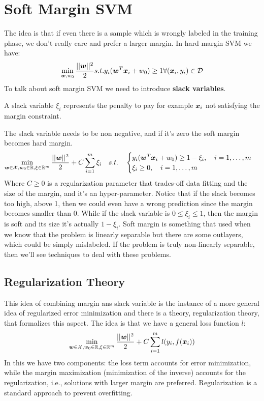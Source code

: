 \section{Soft Margin SVM}
The idea is that if even there is a sample which is wrongly labeled in the training phase, we don't really care and prefer a larger margin. 
In hard margin SVM we have:
\[
  \min\limits_{\bm{w},w_0} \frac{\vert\vert \bm{w}\vert\vert^2}{2} s.t. y_i(\bm{w}^T\bm{x}_i +w_0)\geq 1 \forall (\bm{x}_i,y_i)\in\mathcal{D}
\]
To talk about soft margin SVM we need to introduce \textbf{slack variables}.
\begin{definition}
  A slack variable $\xi_i$ represents the penalty to pay for example $\bm{x}_i$ not satisfying the margin constraint. 
\end{definition}
The slack variable needs to be non negative, and if it's zero the soft margin becomes hard margin. 
\begin{equation}
  \min\limits_{\bm{w}\in\mathcal{X}, w_0\in\mathbb{R},\xi\in\mathbb{R}^m} \frac{\vert\vert \bm{w}\vert\vert^2}{2}+C\displaystyle\sum_{i=1}^m\xi_i\quad s.t.\quad 
  \begin{cases}
    y_i(\bm{w}^T\bm{x}_i +w_0)\geq 1 -\xi_i,\quad i=1,\hdots, m\\
    \xi_i\geq 0,\quad i=1,\hdots, m
  \end{cases}
  \label{eq:SoftMargin}
\end{equation}
Where $C\geq0$ is a regularization parameter that trades-off data fitting and the size of the margin, and it's an hyper-parameter. \newline
Notice that if the slack becomes too high, above 1, then we could even have a wrong prediction since the margin becomes smaller than 0. While if the slack variable is $0\leq \xi_i\leq1$, then the margin is soft and its size it's actually $1-\xi_i$. \newline
Soft margin is something that used when we know that the problem is linearly separable but there are some outlayers, which could be simply mislabeled. If the problem is truly non-linearly separable, then we'll see techniques to deal with these problems.
%
%
\subsection{Regularization Theory}
This idea of combining margin ans slack variable is the instance of a more general idea of regularized error minimization and there is a theory, regularization theory, that formalizes this aspect. \newline
The idea is that we have a general loss function $l$:
\[\min\limits_{\bm{w}\in\mathcal{X}, w_0\in\mathbb{R},\xi\in\mathbb{R}^m} \frac{\vert\vert \bm{w}\vert\vert^2}{2}+C\displaystyle\sum_{i=1}^ml(y_i,f(\bm{x}_i))\]
In this we have two components: the loss term accounts for error minimization, while the margin maximization (minimization of the inverse) accounts for the regularization, i.e., solutions with larger margin are preferred. \newline
Regularization is a standard approach to prevent overfitting. 
%
%
